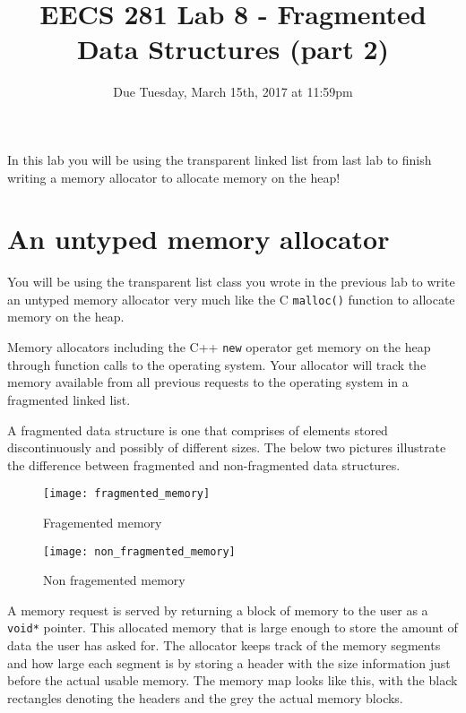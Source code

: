 \documentclass{article}
\begin{document}
\title{\textbf{EECS 281 Lab 8 - Fragmented Data Structures (part 2)}}
\author{Due Tuesday, March 15th, 2017 at 11:59pm}
\date{}
\maketitle
{}
{
   \pagestyle{empty}
}
\thispagestyle{firststyle}

In this lab you will be using the transparent linked list from last lab to
finish writing a memory allocator to allocate memory on the heap!

\section{An untyped memory allocator}
You will be using the transparent list class you wrote in the previous lab to
write an untyped memory allocator very much like the C \texttt{malloc()}
function to allocate memory on the heap.

Memory allocators including the C++ \texttt{new} operator get memory on the
heap through function calls to the operating system.  Your allocator will
track the memory available from all previous requests to the operating system
in a fragmented linked list.

A fragmented data structure is one that comprises of elements stored
discontinuously and possibly of different sizes.  The below two pictures
illustrate the difference between fragmented and non-fragmented data
structures.

\begin{figure}[!htb]
\centering
\texttt{[image: fragmented\_memory]}
\caption{Fragemented memory}
\end{figure}

\begin{figure}[!htb]
\centering
\texttt{[image: non\_fragmented\_memory]}
\caption{Non fragemented memory}
\end{figure}

A memory request is served by returning a block of memory to the user as a
\texttt{void*} pointer.  This allocated memory that is large enough to store
the amount of data the user has asked for.  The allocator keeps track of the
memory segments and how large each segment is by storing a header with the
size information just before the actual usable memory.  The memory map looks
like this, with the black rectangles denoting the headers and the grey the
actual memory blocks.
\end{document}
